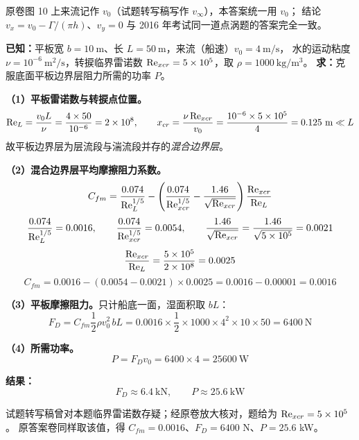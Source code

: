 \begin{tishi}
原卷图 10 上来流记作 $v_0$（试题转写稿写作 $v_\infty$），本答案统一用 $v_0$；
结论 $v_x=v_0-\Gamma/(\pi h)$、$v_y=0$ 与 2016 年考试同一道点涡题的答案完全一致。
\end{tishi}


\begin{jie}
\textbf{已知：}平板宽 $b=10\ \mathrm{m}$、长 $L=50\ \mathrm{m}$，来流（船速）$v_0=4\ \mathrm{m/s}$，
水的运动粘度 $\nu=10^{-6}\ \mathrm{m^2/s}$，转捩临界雷诺数 $\mathrm{Re}_{xcr}=5\times10^5$，取 $\rho=1000\ \mathrm{kg/m^3}$。
\textbf{求：}克服底面平板边界层阻力所需的功率 $P$。

\textbf{（1）平板雷诺数与转捩点位置。}
\[
\Rey_L=\frac{v_0L}{\nu}=\frac{4\times50}{10^{-6}}=2\times10^8,
\qquad
x_{cr}=\frac{\nu\,\Rey_{xcr}}{v_0}=\frac{10^{-6}\times5\times10^5}{4}=0.125\ \mathrm{m}\ll L
\]
故平板边界层为层流段与湍流段并存的\emph{混合边界层}。

\textbf{（2）混合边界层平均摩擦阻力系数。}
\[
C_{fm}=\frac{0.074}{\mathrm{Re}_L^{1/5}}
-\left(\frac{0.074}{\mathrm{Re}_{xcr}^{1/5}}-\frac{1.46}{\sqrt{\mathrm{Re}_{xcr}}}\right)\frac{\mathrm{Re}_{xcr}}{\mathrm{Re}_L}
\]
\[
\frac{0.074}{\mathrm{Re}_L^{1/5}}=0.0016,\qquad
\frac{0.074}{\mathrm{Re}_{xcr}^{1/5}}=0.0054,\qquad
\frac{1.46}{\sqrt{\mathrm{Re}_{xcr}}}=\frac{1.46}{\sqrt{5\times10^5}}=0.0021
\]
\[
\frac{\mathrm{Re}_{xcr}}{\mathrm{Re}_L}=\frac{5\times10^5}{2\times10^8}=0.0025
\]
\[
C_{fm}=0.0016-\left(0.0054-0.0021\right)\times0.0025=0.0016-0.00001=0.0016
\]

\textbf{（3）平板摩擦阻力。}只计船底一面，湿面积取 $bL$：
\[
F_D=C_{fm}\frac{1}{2}\rho v_0^2\,bL
=0.0016\times\frac{1}{2}\times1000\times4^2\times10\times50=6400\ \mathrm{N}
\]

\textbf{（4）所需功率。}
\[
P=F_Dv_0=6400\times4=25600\ \mathrm{W}
\]

\textbf{结果：}
\[
\boxed{F_D\approx6.4\ \mathrm{kN},\qquad P\approx25.6\ \mathrm{kW}}
\]
\end{jie}

\begin{tishi}
试题转写稿曾对本题临界雷诺数存疑；经原卷放大核对，题给为 $\mathrm{Re}_{xcr}=5\times10^5$。
原答案卷同样取该值，得 $C_{fm}=0.0016$、$F_D=6400$ N、$P=25.6$ kW。
\end{tishi}


